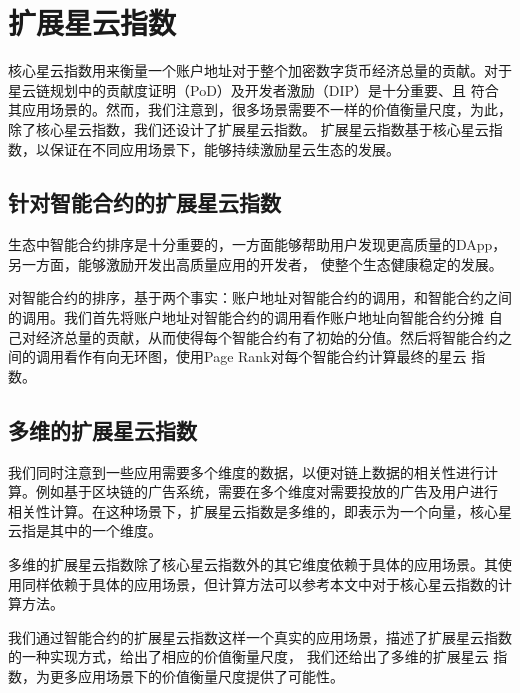 \section{扩展星云指数}
核心星云指数用来衡量一个账户地址对于整个加密数字货币经济总量的贡献。对于星云链规划中的贡献度证明（PoD）及开发者激励（DIP）是十分重要、且
符合其应用场景的。然而，我们注意到，很多场景需要不一样的价值衡量尺度，为此，除了核心星云指数，我们还设计了扩展星云指数。
扩展星云指数基于核心星云指数，以保证在不同应用场景下，能够持续激励星云生态的发展。

\subsection{针对智能合约的扩展星云指数}
生态中智能合约排序是十分重要的，一方面能够帮助用户发现更高质量的DApp，另一方面，能够激励开发出高质量应用的开发者，
使整个生态健康稳定的发展。

对智能合约的排序，基于两个事实：账户地址对智能合约的调用，和智能合约之间的调用。我们首先将账户地址对智能合约的调用看作账户地址向智能合约分摊
自己对经济总量的贡献，从而使得每个智能合约有了初始的分值。然后将智能合约之间的调用看作有向无环图，使用Page Rank对每个智能合约计算最终的星云
指数。


\subsection{多维的扩展星云指数}
我们同时注意到一些应用需要多个维度的数据，以便对链上数据的相关性进行计算。例如基于区块链的广告系统，需要在多个维度对需要投放的广告及用户进行
相关性计算。在这种场景下，扩展星云指数是多维的，即表示为一个向量，核心星云指是其中的一个维度。

多维的扩展星云指数除了核心星云指数外的其它维度依赖于具体的应用场景。其使用同样依赖于具体的应用场景，但计算方法可以参考本文中对于核心星云指数的计算方法。

\vspace{2em}

我们通过智能合约的扩展星云指数这样一个真实的应用场景，描述了扩展星云指数的一种实现方式，给出了相应的价值衡量尺度，
我们还给出了多维的扩展星云
指数，为更多应用场景下的价值衡量尺度提供了可能性。
